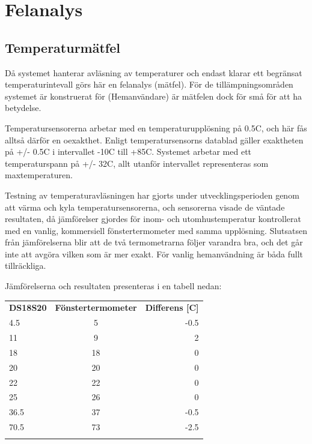 \documentclass[a4paper,11pt]{article}
\begin{document}
\section{Felanalys}

\subsection{Temperaturmätfel}

Då systemet hanterar avläsning av temperaturer och endast klarar ett begränsat temperaturintevall
görs här en felanalys (mätfel). För de tillämpningsområden systemet är konstruerat för (Hemanvändare) 
är mätfelen dock för små för att ha betydelse.

Temperatursensorerna arbetar med en temperaturupplösning på 0.5C, och här fås alltså därför en oexakthet.
Enligt temperatursensorns datablad gäller exaktheten på +/- 0.5C i intervallet -10C till +85C.
Systemet arbetar med ett temperaturspann på +/- 32C, allt utanför intervallet representeras som maxtemperaturen.

Testning av temperaturavläsningen har gjorts under utvecklingsperioden genom att värma och kyla temperatursensorerna,
och sensorerna visade de väntade resultaten, då jämförelser gjordes för inom- och utomhustemperatur kontrollerat med
en vanlig, kommersiell fönstertermometer med samma upplösning. Slutsatsen från jämförelserna blir att de två 
termometrarna följer varandra bra, och det går inte att avgöra vilken som är mer exakt. För vanlig hemanvändning
är båda fullt tillräckliga.

Jämförelserna och resultaten presenteras i en tabell nedan: 

	\begin{tabular}{l c r}
		\\{\bf DS18S20} & {\bf Fönstertermometer} & {\bf Differens [C]}\\
		4.5 & 5 & -0.5\\		
		11 & 9 & 2\\		
		18 & 18 & 0\\
		20 & 20 & 0\\	
		22 & 22 & 0\\
		25 & 26 & 0\\		
		36.5 & 37 & -0.5\\
		70.5 & 73 & -2.5 \\\\
	\end{tabular}

\pagebreak
\end{document}
